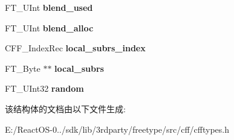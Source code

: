 \begin{DoxyCompactItemize}
F\+T\+\_\+\+U\+Int {\bfseries blend\+\_\+used}
\item 
\mbox{\label{struct_c_f_f___sub_font_rec___ae4a991a8635f39862d920588df217ddb}} 
F\+T\+\_\+\+U\+Int {\bfseries blend\+\_\+alloc}
\item 
\mbox{\label{struct_c_f_f___sub_font_rec___a7ad534c23d38686ce2dec15f1a5bfc67}} 
C\+F\+F\+\_\+\+Index\+Rec {\bfseries local\+\_\+subrs\+\_\+index}
\item 
\mbox{\label{struct_c_f_f___sub_font_rec___a66ff81703fc8280ac33c40b8d5765ed2}} 
F\+T\+\_\+\+Byte $\ast$$\ast$ {\bfseries local\+\_\+subrs}
\item 
\mbox{\label{struct_c_f_f___sub_font_rec___aa19465f11875ea3ac877386506e3cc1c}} 
F\+T\+\_\+\+U\+Int32 {\bfseries random}
\end{DoxyCompactItemize}


该结构体的文档由以下文件生成\+:\begin{DoxyCompactItemize}
\item 
E\+:/\+React\+O\+S-\/0../sdk/lib/3rdparty/freetype/src/cff/cfftypes.\+h\end{DoxyCompactItemize}
